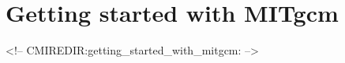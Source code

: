 
\chapter[Getting Started with MITgcm]{Getting started with MITgcm}
\label{chap:getting_started}

\begin{rawhtml}
<!-- CMIREDIR:getting_started_with_mitgcm: -->
\end{rawhtml}



\newpage


\newpage


\newpage



